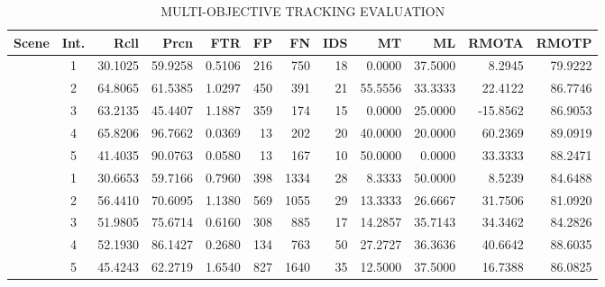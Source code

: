 \documentclass[lettersize,journal]{IEEEtran}
\begin{document}
\begin{table}[t]
	\centering
	\caption{MULTI-OBJECTIVE TRACKING EVALUATION}
	\label{tab:2}
	\small
	\begin{tabular}{@{}l@{\hspace{1em}}c@{\hspace{0.5em}}*{10}{r}@{}}
		\toprule
		\textbf{Scene} & \textbf{Int.} & \textbf{Rcll} & \textbf{Prcn} & \textbf{FTR} & \textbf{FP} & \textbf{FN} & \textbf{IDS} & \textbf{MT} & \textbf{ML} & \textbf{RMOTA} & \textbf{RMOTP} \\
		\midrule
		& 1 & 30.1025 & 59.9258 & 0.5106 & 216 & 750 & 18 & 0.0000 & 37.5000 & 8.2945 & 79.9222\\
		& 2 & 64.8065 & 61.5385 & 1.0297 & 450 & 391 & 21 & 55.5556 & 33.3333 & 22.4122 & 86.7746\\
		& 3 & 63.2135 & 45.4407 & 1.1887 & 359 & 174 & 15 & 0.0000 & 25.0000 & -15.8562 & 86.9053\\
		& 4 & 65.8206 & 96.7662 & 0.0369 & 13 & 202 & 20 & 40.0000 & 20.0000 & 60.2369 & 89.0919\\
		& 5 & 41.4035 & 90.0763 & 0.0580 & 13 & 167 & 10 & 50.0000 & 0.0000 & 33.3333 & 88.2471\\
		\midrule
		& 1 & 30.6653 & 59.7166 & 0.7960 & 398 & 1334 & 28 & 8.3333 & 50.0000 & 8.5239 & 84.6488\\
		& 2 & 56.4410 & 70.6095 & 1.1380 & 569 & 1055 & 29 & 13.3333 & 26.6667 & 31.7506 & 81.0920\\
		& 3 & 51.9805 & 75.6714 & 0.6160 & 308 & 885 & 17 & 14.2857 & 35.7143 & 34.3462 & 84.2826\\
		& 4 & 52.1930 & 86.1427 & 0.2680 & 134 & 763 & 50 & 27.2727 & 36.3636 & 40.6642 & 88.6035\\
		& 5 & 45.4243 & 62.2719 & 1.6540 & 827 & 1640 & 35 & 12.5000 & 37.5000 & 16.7388 & 86.0825\\
		\bottomrule
	\end{tabular}
\end{table}
\end{document}
